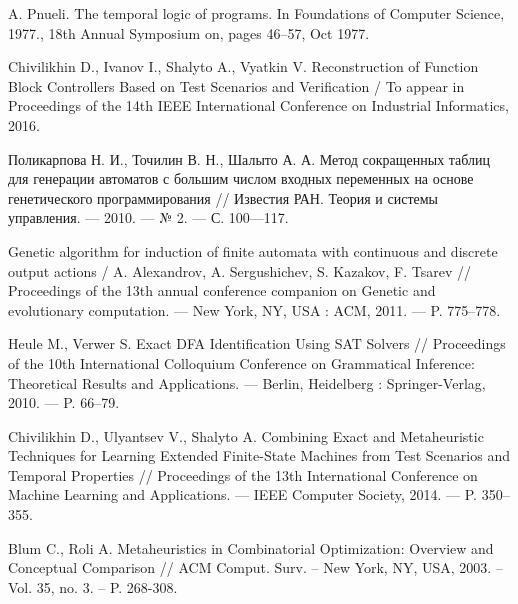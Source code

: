 \documentclass[14pt]{article}
\begin{document}
\begin{thebibliography}{99}
A. Pnueli. The temporal logic of programs.
In Foundations of Computer Science, 1977., 18th Annual Symposium on, pages 46–57, Oct 1977.

Chivilikhin D., Ivanov I., Shalyto A., Vyatkin V. Reconstruction of Function Block
Controllers Based on Test Scenarios and Verification / To appear in Proceedings of
the 14th IEEE International Conference on Industrial Informatics, 2016.

Поликарпова Н. И., Точилин В. Н., Шалыто А. А.
Метод сокращенных таблиц для генерации автоматов с большим числом входных
переменных на основе генетического программирования // Известия РАН.
Теория и системы управления. — 2010. — № 2. — С. 100—117.

Genetic algorithm for induction of finite automata with continuous and
discrete output actions / A. Alexandrov, A. Sergushichev, S. Kazakov,
F. Tsarev // Proceedings of the 13th annual conference companion on
Genetic and evolutionary computation. — New York, NY, USA : ACM,
2011. — P. 775–778.

Heule M., Verwer S. Exact DFA Identification Using SAT Solvers // Proceedings
of the 10th International Colloquium Conference on Grammatical
Inference: Theoretical Results and Applications. — Berlin, Heidelberg
: Springer-Verlag, 2010. — P. 66–79.

Chivilikhin D., Ulyantsev V., Shalyto A. Combining Exact and Metaheuristic
Techniques for Learning Extended Finite-State Machines from
Test Scenarios and Temporal Properties // Proceedings of the 13th International
Conference on Machine Learning and Applications. — IEEE
Computer Society, 2014. — P. 350–355.

Blum C., Roli A. Metaheuristics in Combinatorial Optimization: Overview and
Conceptual Comparison // ACM Comput. Surv. -- New York, NY, USA, 2003. --
Vol. 35, no. 3. -- P. 268-308.

\end{thebibliography}
\end{document}
